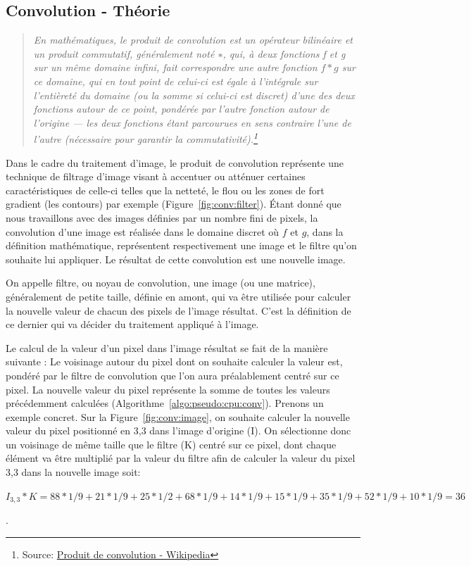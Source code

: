 \subsection{Convolution - Théorie}
\label{ssec:convtheo}
\begin{quotation}
\textit{En mathématiques, le produit de convolution est un opérateur bilinéaire et un produit commutatif, généralement noté $∗$, qui, à deux fonctions f et g sur un même domaine infini, fait correspondre une autre fonction $f * g$ sur ce domaine, qui en tout point de celui-ci est égale à l'intégrale sur l'entièreté du domaine (ou la somme si celui-ci est discret) d'une des deux fonctions autour de ce point, pondérée par l'autre fonction autour de l'origine — les deux fonctions étant parcourues en sens contraire l'une de l'autre (nécessaire pour garantir la commutativité).\footnote{Source: \href{https://fr.wikipedia.org/wiki/Produit_de_convolution}{Produit de convolution - Wikipedia}}}
\end{quotation}

Dans le cadre du traitement d'image, le produit de convolution représente une technique de filtrage d'image visant à accentuer ou atténuer certaines caractéristiques de celle-ci telles que la netteté, le flou ou les zones de fort gradient (les contours) par exemple (Figure~\ref{fig:conv:filter}). Étant donné que nous travaillons avec des images définies par un nombre fini de pixels, la convolution d'une image est réalisée dans le domaine discret où $f$ et $g$, dans la définition mathématique, représentent respectivement une image et le filtre qu'on souhaite lui appliquer. Le résultat de cette convolution est une nouvelle image.

On appelle filtre, ou noyau de convolution, une image (ou une matrice), généralement de petite taille, définie en amont, qui va être utilisée pour calculer la nouvelle valeur de chacun des pixels de l'image résultat. C'est la définition de ce dernier qui va décider du traitement appliqué à l'image. 

Le calcul de la valeur d'un pixel dans l'image résultat se fait de la manière suivante : Le voisinage autour du pixel dont on souhaite calculer la valeur est, pondéré par le filtre de convolution que l'on aura préalablement centré sur ce pixel. La nouvelle valeur du pixel représente la somme de toutes les valeurs précédemment calculées (Algorithme~\ref{algo:pseudo:cpu:conv}). Prenons un exemple concret. Sur la Figure~\ref{fig:conv:image}, on souhaite calculer la nouvelle valeur du pixel positionné en 3,3 dans l'image d'origine (I). On sélectionne donc un voisinage de même taille que le filtre (K) centré sur ce pixel, dont chaque élément va être multiplié par la valeur du filtre afin de calculer la valeur du pixel 3,3 dans la nouvelle image soit: 
\begin{center}
$I_{3,3} * K = 88 * 1/9 + 21 * 1/9 + 25 * 1/2 + 68 * 1/9 + 14 * 1/9 + 15 * 1/9 + 35 * 1/9 + 52 * 1/9 + 10 * 1/9 = 36$
\end{center}.


